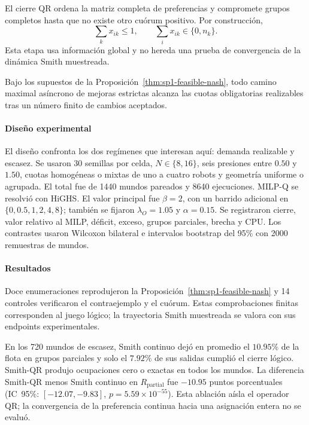 El cierre QR ordena la matriz completa de preferencias y compromete grupos completos hasta que no existe otro cuórum positivo. Por construcción,
\begin{equation}
 \sum_kx_{ik}\leq1,\qquad \sum_ix_{ik}\in\{0,n_k\}.
 \label{eq:sp1-qr-invariants}
\end{equation}
Esta etapa usa información global y no hereda una prueba de convergencia de la dinámica Smith muestreada.

\begin{corolario}
\label{cor:sp1-strategic-regulation}
Bajo los supuestos de la Proposición~\ref{thm:sp1-feasible-nash}, todo camino maximal asíncrono de mejoras estrictas alcanza las cuotas obligatorias realizables tras un número finito de cambios aceptados.
\end{corolario}
\paragraph{Diseño experimental}

El diseño confronta los dos regímenes que interesan aquí: demanda realizable y escasez. Se usaron 30 semillas por celda, $N\in\{8, 16\}$, seis presiones entre $0.50$ y $1.50$, cuotas homogéneas o mixtas de uno a cuatro robots y geometría uniforme o agrupada. El total fue de 1440 mundos pareados y 8640 ejecuciones. MILP-Q se resolvió con HiGHS. El valor principal fue $\beta=2$, con un barrido adicional en $\{0,0.5,1,2,4,8\}$; también se fijaron $\lambda_O=1.05$ y $\alpha=0.15$. Se registraron cierre, valor relativo al MILP, déficit, exceso, grupos parciales, brecha y CPU. Los contrastes usaron Wilcoxon bilateral e intervalos \mbox{bootstrap} del 95\% con 2000 remuestras de mundos.

\paragraph{Resultados}

Doce enumeraciones reprodujeron la Proposición~\ref{thm:sp1-feasible-nash} y 14 controles verificaron el contraejemplo y el cuórum. Estas comprobaciones finitas corresponden al juego lógico; la trayectoria Smith muestreada se valora con sus endpoints experimentales.

En los 720 mundos de escasez, Smith continuo dejó en promedio el \(10.95\%\) de la flota en grupos parciales y solo el \(7.92\%\) de sus salidas cumplió el cierre lógico. Smith-QR produjo ocupaciones cero o exactas en todos los mundos. La diferencia Smith-QR menos Smith continuo en \(R_{\mathrm{partial}}\) fue \(-10.95\) puntos porcentuales (IC~95\%: \([-12.07,-9.83]\), \(p=5.59\times10^{-55}\)). Esta ablación aísla el operador QR; la convergencia de la preferencia continua hacia una asignación entera no se evaluó.

